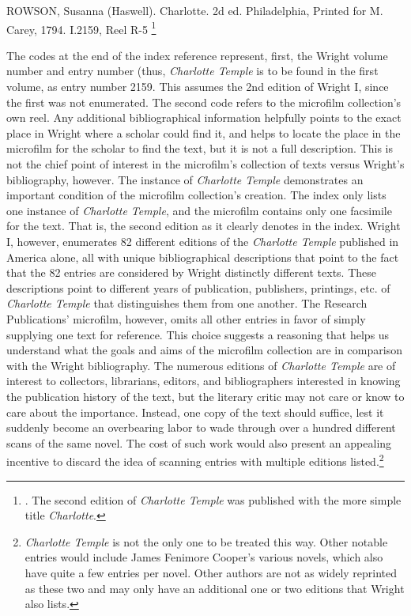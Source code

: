 \begin{displayquote}
ROWSON, Susanna (Haswell). Charlotte. 2d ed. Philadelphia, Printed for M. Carey, 1794. I.2159, Reel R-5 \footnote{\autocite[318]{wright_american_1974}. The second edition of \textit{Charlotte Temple} was published with the more simple title \textit{Charlotte}.}
\end{displayquote}

The codes at the end of the index reference represent, first, the Wright volume number and entry number (thus, \textit{Charlotte Temple} is to be found in the first volume, as entry number 2159. This assumes the 2nd edition of Wright I, since the first was not enumerated. The second code refers to the microfilm collection's own reel. Any additional bibliographical information helpfully points to the exact place in Wright where a scholar could find it, and helps to locate the place in the microfilm for the scholar to find the text, but it is not a full description. This is not the chief point of interest in the microfilm's collection of texts versus Wright's bibliography, however. The instance of \textit{Charlotte Temple} demonstrates an important condition of the microfilm collection's creation. The index only lists one instance of \textit{Charlotte Temple}, and the microfilm contains only one facsimile for the text. That is, the second edition as it clearly denotes in the index. Wright I, however, enumerates 82 different editions of the \textit{Charlotte Temple} published in America alone, all with unique bibliographical descriptions that point to the fact that the 82 entries are considered by Wright distinctly different texts.\autocite[232-238]{wright_american_1948} These descriptions point to different years of publication, publishers, printings, etc. of \textit{Charlotte Temple} that distinguishes them from one another. The Research Publications' microfilm, however, omits all other entries in favor of simply supplying one text for reference. This choice suggests a reasoning that helps us understand what the goals and aims of the microfilm collection are in comparison with the Wright bibliography. The numerous editions of \textit{Charlotte Temple} are of interest to collectors, librarians, editors, and bibliographers interested in knowing the publication history of the text, but the literary critic may not care or know to care about the importance. Instead, one copy of the text should suffice, lest it suddenly become an overbearing labor to wade through over a hundred different scans of the same novel. The cost of such work would also present an appealing incentive to discard the idea of scanning entries with multiple editions listed.\footnote{\textit{Charlotte Temple} is not the only one to be treated this way. Other notable entries would include James Fenimore Cooper's various novels, which also have quite a few entries per novel. Other authors are not as widely reprinted as these two and may only have an additional one or two editions that Wright also lists.}

